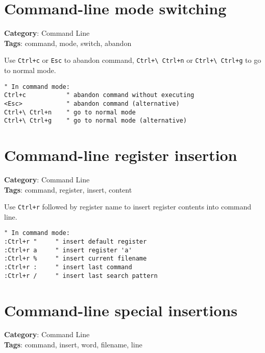 {{{{\section{Command-line mode switching}

\textbf{Category}: Command Line\\ \textbf{Tags}: command, mode, switch, abandon
\vspace{0.5cm}

Use {\footnotesize \Verb§Ctrl+c§} or {\footnotesize \Verb§Esc§} to abandon command, {\footnotesize \Verb§Ctrl+\ Ctrl+n§} or {\footnotesize \Verb§Ctrl+\ Ctrl+g§} to go to normal mode.

\begin{Exa*}{}
\begin{Verbatim}[fontsize=\footnotesize, breaklines, breakanywhere]
" In command mode:
Ctrl+c           " abandon command without executing
<Esc>            " abandon command (alternative)
Ctrl+\ Ctrl+n    " go to normal mode
Ctrl+\ Ctrl+g    " go to normal mode (alternative)
\end{Verbatim}
\end{Exa*}

\section{Command-line register insertion}

\textbf{Category}: Command Line\\ \textbf{Tags}: command, register, insert, content
\vspace{0.5cm}

Use {\footnotesize \Verb§Ctrl+r§} followed by register name to insert register contents into command line.

\begin{Exa*}{}
\begin{Verbatim}[fontsize=\footnotesize, breaklines, breakanywhere]
" In command mode:
:Ctrl+r "     " insert default register
:Ctrl+r a     " insert register 'a'
:Ctrl+r %     " insert current filename
:Ctrl+r :     " insert last command
:Ctrl+r /     " insert last search pattern
\end{Verbatim}
\end{Exa*}

\section{Command-line special insertions}

\textbf{Category}: Command Line\\ \textbf{Tags}: command, insert, word, filename, line
\vspace{0.5cm}

}}}}
